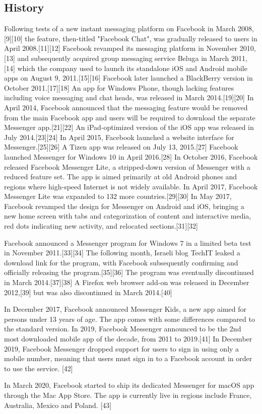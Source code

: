 \documentclass[12pt]{article}
\begin{document}
\subsection{History}



Following tests of a new instant messaging platform on Facebook in March 2008,[9][10] the feature, then-titled "Facebook Chat", was gradually released to users in April 2008.[11][12] Facebook revamped its messaging platform in November 2010,[13] and subsequently acquired group messaging service Beluga in March 2011,[14] which the company used to launch its standalone iOS and Android mobile apps on August 9, 2011.[15][16] Facebook later launched a BlackBerry version in October 2011.[17][18] An app for Windows Phone, though lacking features including voice messaging and chat heads, was released in March 2014.[19][20] In April 2014, Facebook announced that the messaging feature would be removed from the main Facebook app and users will be required to download the separate Messenger app.[21][22] An iPad-optimized version of the iOS app was released in July 2014.[23][24] In April 2015, Facebook launched a website interface for Messenger.[25][26] A Tizen app was released on July 13, 2015.[27] Facebook launched Messenger for Windows 10 in April 2016.[28] In October 2016, Facebook released Facebook Messenger Lite, a stripped-down version of Messenger with a reduced feature set. The app is aimed primarily at old Android phones and regions where high-speed Internet is not widely available. In April 2017, Facebook Messenger Lite was expanded to 132 more countries.[29][30] In May 2017, Facebook revamped the design for Messenger on Android and iOS, bringing a new home screen with tabs and categorization of content and interactive media, red dots indicating new activity, and relocated sections.[31][32]

Facebook announced a Messenger program for Windows 7 in a limited beta test in November 2011.[33][34] The following month, Israeli blog TechIT leaked a download link for the program, with Facebook subsequently confirming and officially releasing the program.[35][36] The program was eventually discontinued in March 2014.[37][38] A Firefox web browser add-on was released in December 2012,[39] but was also discontinued in March 2014.[40]

In December 2017, Facebook announced Messenger Kids, a new app aimed for persons under 13 years of age. The app comes with some differences compared to the standard version. In 2019, Facebook Messenger announced to be the 2nd most downloaded mobile app of the decade, from 2011 to 2019.[41] In December 2019, Facebook Messenger dropped support for users to sign in using only a mobile number, meaning that users must sign in to a Facebook account in order to use the service. [42]

In March 2020, Facebook started to ship its dedicated Messenger for macOS app through the Mac App Store. The app is currently live in regions include France, Australia, Mexico and Poland. [43] 
\end{document}
